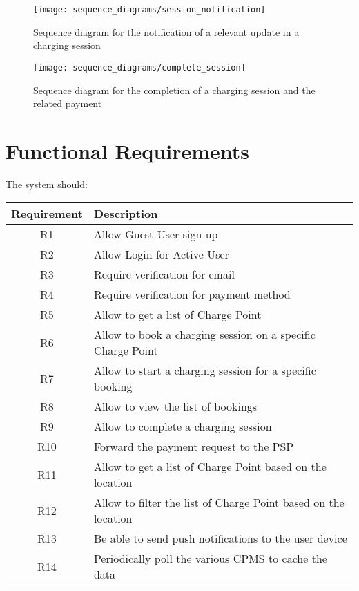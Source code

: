 \begin{figure}[h]
\centering
\texttt{[image: sequence\_diagrams/session\_notification]}
\caption{Sequence diagram for the notification of a relevant update in a charging session}
\end{figure}


\begin{figure}[h]
\centering
\texttt{[image: sequence\_diagrams/complete\_session]}
\caption{Sequence diagram for the completion of a charging session and the related payment}
\end{figure}

\clearpage
\newpage


\section{Functional Requirements}

The system should:\\

\begin{tabular}{|c|l|}
	\hline
	\bf{Requirement} & \bf{Description} \\
	\hline
	R1 & Allow Guest User sign-up\\
	\hline
	R2 & Allow Login for Active User\\
	\hline
	R3 & Require verification for email\\
	\hline
	R4 & Require verification for payment method\\
	\hline
	R5 & Allow to get a list of Charge Point\\
	\hline
	R6 & Allow to book a charging session on a specific Charge Point\\
	\hline
	R7 & Allow to start a charging session for a specific booking\\
	\hline
	R8 & Allow to view the list of bookings\\
	\hline
	R9 & Allow to complete a charging session\\
	\hline
	R10 & Forward the payment request to the PSP\\
	\hline
	R11 & Allow to get a list of Charge Point based on the location\\
	\hline
	R12 & Allow to filter the list of Charge Point based on the location\\
	\hline
	R13 & Be able to send push notifications to the user device\\
	\hline
	R14 & Periodically poll the various CPMS to cache the data\\
	
	\hline
\end{tabular}


